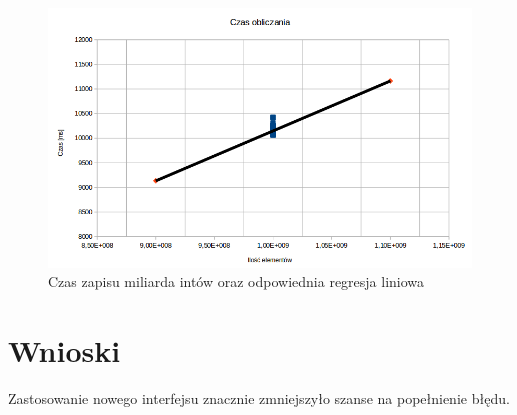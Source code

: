 \documentclass[11pt,a4paper]{article}
\begin{document}
\begin{figure}[hb]
	\begin{center}
		\includegraphics[scale=0.5]{../wykresy/miliard.png}
		\caption{Czas zapisu miliarda intów oraz odpowiednia regresja liniowa}
	\end{center}
\end{figure}


\section{Wnioski}
Zastosowanie nowego interfejsu znacznie zmniejszyło szanse na popełnienie błędu.
\end{document}
